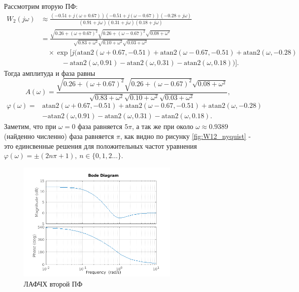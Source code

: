 Рассмотрим вторую ПФ:
\begin{equation*}
    \begin{split}
        W_2(j\omega) & \approx
        \frac{(-0.51 + j(\omega + 0.67))(-0.51 + j(\omega - 0.67))(-0.28 + j\omega)}
             {(0.91 + j\omega)(0.31 + j\omega)(0.18 + j\omega)} \\
        & = 
        \frac{
            \sqrt{0.26 + (\omega + 0.67)^2} \sqrt{0.26 + (\omega - 0.67)^2} \sqrt{0.08 + \omega^2}
        }{
            \sqrt{0.83 + \omega^2} \sqrt{0.10 + \omega^2} \sqrt{0.03 + \omega^2}
        } \\
        & \quad \times 
        \exp\Big[j(
            \text{atan2}(\omega + 0.67, -0.51) 
            + \text{atan2}(\omega - 0.67, -0.51) 
            + \text{atan2}(\omega, -0.28) \\
        & \quad \quad \quad
            - \text{atan2}(\omega, 0.91) 
            - \text{atan2}(\omega, 0.31) 
            - \text{atan2}(\omega, 0.18))
        \Big].
    \end{split}
\end{equation*}
Тогда амплитуда и фаза равны
\begin{equation*}
    A(\omega)=\frac{
            \sqrt{0.26 + (\omega + 0.67)^2} \sqrt{0.26 + (\omega - 0.67)^2} \sqrt{0.08 + \omega^2}
        }{
            \sqrt{0.83 + \omega^2} \sqrt{0.10 + \omega^2} \sqrt{0.03 + \omega^2}
        },
\end{equation*}
\begin{equation*}
\begin{split}
    \varphi(\omega)=&\text{atan2}(\omega + 0.67, -0.51) 
    + \text{atan2}(\omega - 0.67, -0.51) 
    + \text{atan2}(\omega, -0.28)\\
    &- \text{atan2}(\omega, 0.91) 
    - \text{atan2}(\omega, 0.31) 
    - \text{atan2}(\omega, 0.18).
\end{split}
\end{equation*}
Заметим, что при $\omega=0$ фаза равняется $5\pi$, а так же при около $\omega\approx 0.9389$
(найденно численно)  фаза равняется $\pi$, как видно по рисунку \ref{fig:W12_nyquist}
 - это единсвенные решения для положительных частот уравнения $\varphi(\omega)=\pm(2n\pi+1),\ n\in\{0, 1, 2\dots\}$.

 \begin{figure}[H]
    \centering
    \includegraphics[width=0.7\textwidth]{figs/task_2_W2_bode.png}
    \caption{ЛАФЧХ второй ПФ}
    \label{fig:2W2_bode}
\end{figure}

